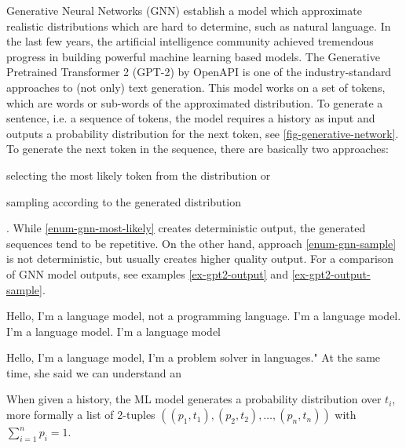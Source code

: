 \documentclass[english,version-2020-11]{uzl-thesis}
\begin{document}
Generative Neural Networks (GNN) establish a model which approximate realistic distributions which are hard to determine, such as natural language.
In the last few years, the artificial intelligence community achieved tremendous progress in building powerful machine learning based models.
The Generative Pretrained Transformer 2 (GPT-2) by OpenAPI is one of the industry-standard approaches to (not only) text generation.
This model works on a set of tokens, which are words or sub-words of the approximated distribution.
To generate a sentence, i.e. a sequence of tokens, the model requires a history as input and outputs a probability distribution for the next token, see \ref{fig-generative-network}.
To generate the next token in the sequence, there are basically two approaches:
\begin{enumerate*}[label=(\roman*)] \item \label{enum-gnn-most-likely} selecting the most likely token from the distribution or \item \label{enum-gnn-sample} sampling according to the generated distribution \end{enumerate*}.
While \ref{enum-gnn-most-likely} creates deterministic output, the generated sequences tend to be repetitive.
On the other hand, approach \ref{enum-gnn-sample} is not deterministic, but usually creates higher quality output.
For a comparison of GNN model outputs, see examples \ref{ex-gpt2-output} and \ref{ex-gpt2-output-sample}.


\begin{example}
	Hello, I'm a language model, not a programming language. I'm a language model. I'm a language model. I'm a language model
	\label{ex-gpt2-output}
\end{example}


\begin{example}
	Hello, I'm a language model, I'm a problem solver in languages."
	At the same time, she said we can understand an
	\label{ex-gpt2-output-sample}
\end{example}

When given a history, the ML model generates a probability distribution over $t_i$, more formally a list of 2-tuples $((p_1, t_1), (p_2, t_2), \dots, (p_n, t_n))$ with $\sum_{i=1}^n p_i = 1$.
\end{document}
